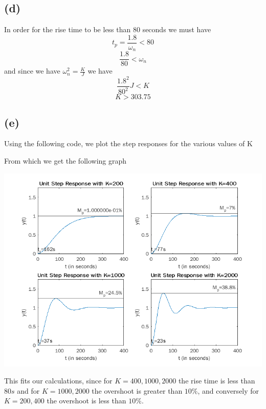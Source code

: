 \documentclass[12pt]{article}
\begin{document}
\subsection*{(d)}
In order for the rise time to be less than 80 seconds we must have
$$t_p=\frac{1.8}{\omega_n}<80$$
$$\frac{1.8}{80}<\omega_n$$
and since we have $\omega_n^2=\frac{K}{J}$ we have
$$\frac{1.8^2}{80^2}J<K$$
$$K>\boxed{303.75}$$
\subsection*{(e)}
Using the following code, we plot the step responses for the various values of K

From which we get the following graph

\includegraphics[scale=.5]{Fig2.png}

This fits our calculations, since for $K=400,1000,2000$ the rise time is less than $80s$ and for 
$K=1000,2000$ the overshoot is greater than $10\%$, and conversely for $K=200,400$ the overshoot
is less than $10\%$.
\end{document}

